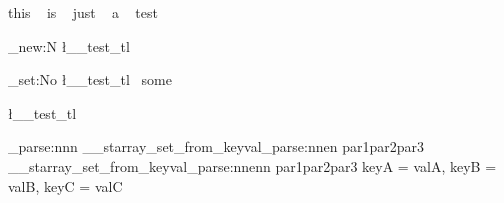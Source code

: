 \documentclass{article}
\begin{document}
 this ~  is ~ just ~ a  ~ test

\tl_new:N \l__test_tl

\tl_set:No \l__test_tl { ~some }

\l__test_tl 

\par
\keyval_parse:nnn
  {\__starray_set_from_keyval_parse:nnen {par1}{par2}{par3}}
  {\__starray_set_from_keyval_parse:nnenn {par1}{par2}{par3}}
  {
    keyA = valA,
    keyB = valB,
    keyC = valC
  }
 
 
 
\end{document}
